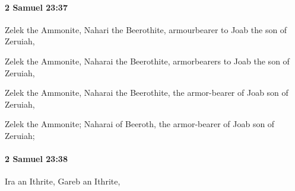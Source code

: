 		\paragraph{2 Samuel 23:37} %
			\label{2SAMUEL-23-37}

			Zelek the Ammonite, Nahari the Beerothite, armourbearer to Joab the son of Zeruiah,

			\begin{versebox}
					\item[BHS] 
					\item[ASV] Zelek the Ammonite, Naharai the Beerothite, armorbearers to Joab the son of Zeruiah,
					\item[NIV] Zelek the Ammonite, Naharai the Beerothite, the armor-bearer of Joab son of Zeruiah,
					\item[NRSV] Zelek the Ammonite; Naharai of Beeroth, the armor-bearer of Joab son of Zeruiah;
			\end{versebox}

		\paragraph{2 Samuel 23:38} %
			\label{2SAMUEL-23-38}

			Ira an Ithrite, Gareb an Ithrite,

